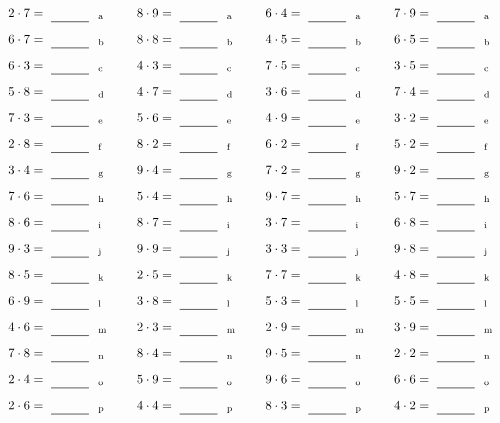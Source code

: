 \documentclass
[
  draft    = true,
  fontsize = 11pt,
  parskip  = half-
]
{scrartcl}
\begin{document}
\par\vfill\par
\begin{align*}
    \pline{2\cdot7}&=\rline{a}
  & \pline{8\cdot9}&=\rline{a}
  & \pline{6\cdot4}&=\rline{a}
  & \pline{7\cdot9}&=\rline{a} \\[1ex]
    \pline{6\cdot7}&=\rline{b}
  & \pline{8\cdot8}&=\rline{b}
  & \pline{4\cdot5}&=\rline{b}
  & \pline{6\cdot5}&=\rline{b} \\[1ex]
    \pline{6\cdot3}&=\rline{c}
  & \pline{4\cdot3}&=\rline{c}
  & \pline{7\cdot5}&=\rline{c}
  & \pline{3\cdot5}&=\rline{c} \\[1ex]
    \pline{5\cdot8}&=\rline{d}
  & \pline{4\cdot7}&=\rline{d}
  & \pline{3\cdot6}&=\rline{d}
  & \pline{7\cdot4}&=\rline{d} \\[1ex]
    \pline{7\cdot3}&=\rline{e}
  & \pline{5\cdot6}&=\rline{e}
  & \pline{4\cdot9}&=\rline{e}
  & \pline{3\cdot2}&=\rline{e} \\[1ex]
    \pline{2\cdot8}&=\rline{f}
  & \pline{8\cdot2}&=\rline{f}
  & \pline{6\cdot2}&=\rline{f}
  & \pline{5\cdot2}&=\rline{f} \\[1ex]
    \pline{3\cdot4}&=\rline{g}
  & \pline{9\cdot4}&=\rline{g}
  & \pline{7\cdot2}&=\rline{g}
  & \pline{9\cdot2}&=\rline{g} \\[1ex]
    \pline{7\cdot6}&=\rline{h}
  & \pline{5\cdot4}&=\rline{h}
  & \pline{9\cdot7}&=\rline{h}
  & \pline{5\cdot7}&=\rline{h} \\[1ex]
    \pline{8\cdot6}&=\rline{i}
  & \pline{8\cdot7}&=\rline{i}
  & \pline{3\cdot7}&=\rline{i}
  & \pline{6\cdot8}&=\rline{i} \\[1ex]
    \pline{9\cdot3}&=\rline{j}
  & \pline{9\cdot9}&=\rline{j}
  & \pline{3\cdot3}&=\rline{j}
  & \pline{9\cdot8}&=\rline{j} \\[1ex]
    \pline{8\cdot5}&=\rline{k}
  & \pline{2\cdot5}&=\rline{k}
  & \pline{7\cdot7}&=\rline{k}
  & \pline{4\cdot8}&=\rline{k} \\[1ex]
    \pline{6\cdot9}&=\rline{l}
  & \pline{3\cdot8}&=\rline{l}
  & \pline{5\cdot3}&=\rline{l}
  & \pline{5\cdot5}&=\rline{l} \\[1ex]
    \pline{4\cdot6}&=\rline{m}
  & \pline{2\cdot3}&=\rline{m}
  & \pline{2\cdot9}&=\rline{m}
  & \pline{3\cdot9}&=\rline{m} \\[1ex]
    \pline{7\cdot8}&=\rline{n}
  & \pline{8\cdot4}&=\rline{n}
  & \pline{9\cdot5}&=\rline{n}
  & \pline{2\cdot2}&=\rline{n} \\[1ex]
    \pline{2\cdot4}&=\rline{o}
  & \pline{5\cdot9}&=\rline{o}
  & \pline{9\cdot6}&=\rline{o}
  & \pline{6\cdot6}&=\rline{o} \\[1ex]
    \pline{2\cdot6}&=\rline{p}
  & \pline{4\cdot4}&=\rline{p}
  & \pline{8\cdot3}&=\rline{p}
  & \pline{4\cdot2}&=\rline{p}
\end{align*}
\end{document}

